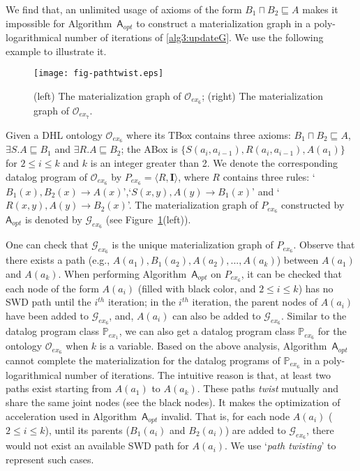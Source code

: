 We find that, an unlimited usage of axioms of the
form $B_1\sqcap B_2\sqsubseteq A$
makes it impossible for Algorithm~$\mathsf{A}_{opt}$ to construct a materialization graph
in a poly-logarithmical number of iterations of \ref{alg3:updateG}.
We use the following example to illustrate it.

\begin{figure}[htbp]
\begin{center}
\texttt{[image: fig-pathtwist.eps]}
\caption{(left) The materialization graph of $\mathcal{O}_{ex_6}$;
(right) The materialization graph of $\mathcal{O}_{ex_7}$.}
\label{fig:ex3_4}
\end{center}
\end{figure}

\begin{example}\label{exp:dhl}
Given a DHL ontology $\mathcal{O}_{ex_6}$ where its TBox contains three axioms:
$B_1\sqcap B_2\sqsubseteq A$, $\exists S.A\sqsubseteq B_1$ and $\exists R.A\sqsubseteq B_2$;
the ABox is $\{S(a_i,a_{i-1}), R(a_i,a_{i-1}), A(a_1)\}$
for $2\leq i\leq k$ and $k$ is an integer greater than 2.
We denote the corresponding datalog program of $\mathcal{O}_{ex_6}$ by $P_{ex_6}=\langle R, \textbf{I}\rangle$,
where $R$ contains three rules: `$B_1(x),B_2(x)\rightarrow A(x)$',`$S(x,y),A(y)\rightarrow B_1(x)$' and `$R(x,y),A(y)\rightarrow B_2(x)$'.
The materialization graph of $P_{ex_6}$ constructed by $\mathsf{A}_{opt}$ is denoted by $\mathcal{G}_{ex_6}$ (see Figure~\ref{fig:ex3_4}(left)).
\end{example}

One can check that $\mathcal{G}_{ex_6}$ is the unique materialization graph of $P_{ex_6}$.
Observe that there exists a path (e.g., $A(a_1),B_1(a_2),A(a_2),...,A(a_k)$) between $A(a_1)$ and $A(a_k)$.
When performing Algorithm~$\mathsf{A}_{opt}$ on $P_{ex_6}$, it can be checked that
each node of the form $A(a_i)$ (filled with black color,
and $2\leq i\leq k$) has no SWD path until the $i^{th}$ iteration;
in the $i^{th}$ iteration, the parent nodes of $A(a_i)$ have been added to $\mathcal{G}_{ex_6}$,
and, $A(a_i)$ can also be added to $\mathcal{G}_{ex_6}$.
Similar to the datalog program class $\mathbb{P}_{ex_1}$, we can also get a
datalog program class $\mathbb{P}_{ex_6}$ for the ontology $\mathcal{O}_{ex_6}$
when $k$ is a variable. Based on the above analysis, Algorithm~$\mathsf{A}_{opt}$ cannot complete the materialization
for the datalog programs of $\mathbb{P}_{ex_6}$ in a poly-logarithmical
number of iterations.
The intuitive reason is that, at least two paths exist
starting from $A(a_1)$ to $A(a_k)$. These paths \emph{twist} mutually and share the same joint nodes (see the black nodes).
It makes the optimization of acceleration used in Algorithm~$\mathsf{A}_{opt}$ invalid.
That is, for each node $A(a_i)$ ($2\leq i\leq k$), until its parents ($B_1(a_i)$ and $B_2(a_i)$) are added
to $\mathcal{G}_{ex_6}$, there would not exist an available SWD path for $A(a_i)$.
We use `\emph{path twisting}' to represent such cases.

